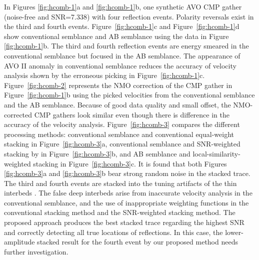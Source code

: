 In Figures \ref{fig:hcomb-1}a and \ref{fig:hcomb-1}b, one synthetic AVO CMP gather (noise-free and SNR=7.338) with four reflection events. Polarity reversals exist in the third and fourth events. 
Figure~\ref{fig:hcomb-1}c and Figure~\ref{fig:hcomb-1}d show
conventional semblance and AB semblance using the data in Figure \ref{fig:hcomb-1}b. The third and fourth reflection events 
are energy smeared in the conventional semblance but focused in the AB semblance. The 
appearance of AVO II anomaly in conventional semblance reduces the accuracy of velocity 
analysis shown by the erroneous picking in Figure~\ref{fig:hcomb-1}c. 
Figure~\ref{fig:hcomb-2} represents the NMO correction of the CMP gather in Figure~\ref{fig:hcomb-1}b
using the picked velocities from the conventional semblance and the AB semblance. Because of good data quality 
and small offset, the NMO-corrected CMP gathers look similar even though there is difference in the accuracy of the velocity analysis.
Figure~\ref{fig:hcomb-3} compares the different processing methods: conventional semblance and conventional 
equal-weight stacking in Figure~\ref{fig:hcomb-3}a, conventional semblance and SNR-weighted stacking by \cite{Neelamani06} in Figure~\ref{fig:hcomb-3}b, and 
AB semblance and local-similarity-weighted stacking in Figure~\ref{fig:hcomb-3}c. It is found that both Figures \ref{fig:hcomb-3}a and \ref{fig:hcomb-3}b bear strong random noise in the stacked trace. The third and fourth events are stacked into the tuning artifacts 
of the thin interbeds \cite[]{Hamlyn14}. The false deep interbeds arise from inaccurate 
velocity analysis in the conventional semblance, and the use of inappropriate weighting functions in the conventional stacking method and the SNR-weighted stacking method. The proposed approach produces the best stacked trace regarding the highest SNR and correctly detecting all true locations of reflections. In this case, the lower-amplitude stacked result for the fourth event by our proposed method needs further investigation.


